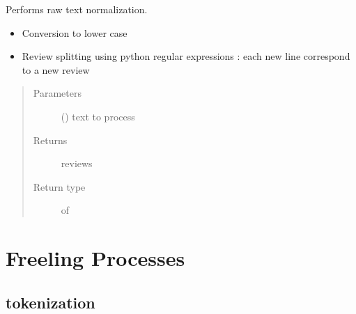 \documentclass[letterpaper,10pt,english]{sphinxmanual}
\begin{document}
\begin{fulllineitems}
\label{\detokenize{process:loacore.process.review_process.normalize}}
Performs raw text normalization.
\begin{itemize}
\item {} 
Conversion to lower case

\item {} 
Review splitting using python regular expressions : each new line correspond to a new review

\end{itemize}
\begin{quote}\begin{description}
\item[{Parameters}] \leavevmode
{} () \textendash{} text to process

\item[{Returns}] \leavevmode
reviews

\item[{Return type}] \leavevmode
{} of 

\end{description}\end{quote}

\end{fulllineitems}



\section{Freeling Processes}
\label{\detokenize{process:freeling-processes}}

\subsection{tokenization}
\label{\detokenize{process:module-loacore.process.sentence_process}}\label{\detokenize{process:tokenization}}
\end{document}
